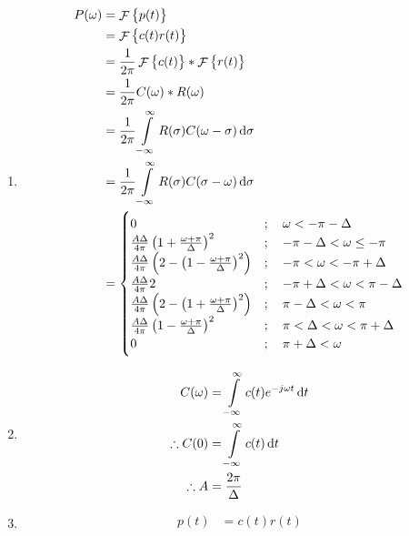 \documentclass[titlepage, fleqn, a4paper, 12pt, twoside]{article}
\theoremstyle{definition}
\theoremstyle{theorem}
\DeclareMathOperator{\FT}{\mathcal{F}}
\begin{document}
\begin{solution}
	\begin{enumerate}
		\item
			\begin{align*}
				P(\omega) &= \FT\left\{ p(t) \right\}\\
				&= \FT\left\{ c(t) r(t) \right\}\\
				&= \frac{1}{2 \pi} \FT\left\{ c(t) \right\} \ast \FT\left\{ r(t) \right\}\\
				&= \frac{1}{2 \pi} C(\omega) \ast R(\omega)\\
				&= \frac{1}{2 \pi} \int\limits_{-\infty}^{\infty} R(\sigma) C(\omega - \sigma) \dif \sigma\\
				&= \frac{1}{2 \pi} \int\limits_{-\infty}^{\infty} R(\sigma) C(\sigma - \omega) \dif \sigma\\
				&=
					\begin{cases}
						0 &;\quad \omega < -\pi - \Delta\\
						\frac{A \Delta}{4 \pi} \left( 1 + \frac{\omega + \pi}{\Delta} \right)^2 &;\quad -\pi - \Delta < \omega \le -\pi\\
						\frac{A \Delta}{4 \pi} \left( 2 - \left( 1 - \frac{\omega + \pi}{\Delta} \right)^2 \right) &;\quad -\pi < \omega < -\pi + \Delta\\
						\frac{A \Delta}{4 \pi} 2 &;\quad -\pi + \Delta < \omega < \pi - \Delta\\
						\frac{A \Delta}{4 \pi} \left( 2 - \left( 1 + \frac{\omega + \pi}{\Delta} \right)^2 \right) &;\quad \pi - \Delta < \omega < \pi\\
						\frac{A \Delta}{4 \pi} \left( 1 - \frac{\omega + \pi}{\Delta} \right)^2 &;\quad \pi < \Delta < \omega < \pi + \Delta\\
						0 &;\quad \pi + \Delta < \omega\\
					\end{cases}
			\end{align*}
		\item
			\begin{align*}
				C(\omega) &= \int\limits_{-\infty}^{\infty} c(t) e^{-j \omega t} \dif t\\
				\therefore C(0) &= \int\limits_{-\infty}^{\infty} c(t) \dif t\\
				\therefore A &= \frac{2 \pi}{\Delta}
			\end{align*}
		\item
			\begin{align*}
				p(t) &= c(t) r(t)\\

\end{align*}
\end{enumerate}
\end{solution}
\end{document}
